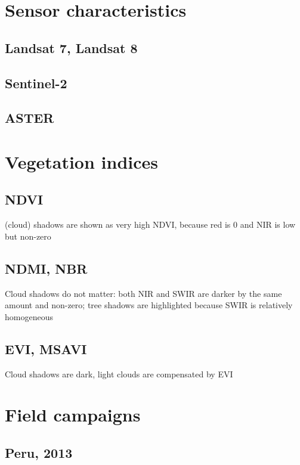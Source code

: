 \documentclass[a4paper,12pt]{scrbook}
\begin{document}
\section{Sensor characteristics}

\subsection{Landsat 7, Landsat 8}

\subsection{Sentinel-2}

\subsection{ASTER}

\section{Vegetation indices}

\subsection{NDVI}

(cloud) shadows are shown as very high \ac{NDVI}, because red is 0 and \ac{NIR} is low but non-zero

\subsection{NDMI, NBR}

Cloud shadows do not matter: both \ac{NIR} and \ac{SWIR} are darker by the same amount and non-zero; tree shadows are highlighted because SWIR is relatively homogeneous

\subsection{EVI, MSAVI}

Cloud shadows are dark, light clouds are compensated by \ac{EVI}

\section{Field campaigns}

\subsection{Peru, 2013}
\end{document}
